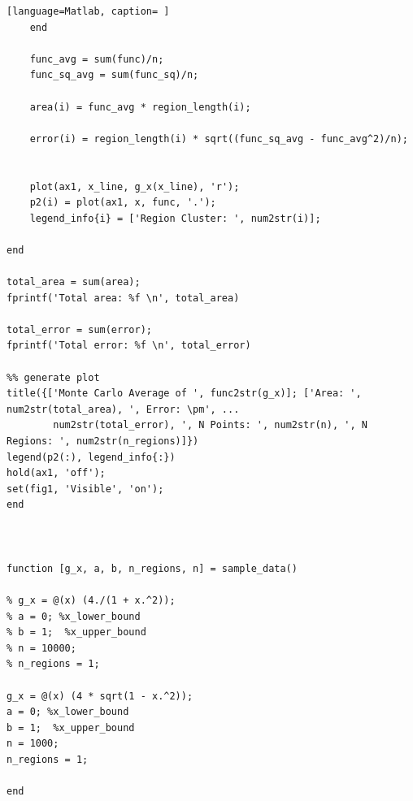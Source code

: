\documentclass[12pt]{article}
\begin{document}
\begin{lstlisting}[language=Matlab, caption= ]
    end
    
    func_avg = sum(func)/n;
    func_sq_avg = sum(func_sq)/n;
    
    area(i) = func_avg * region_length(i);
  
    error(i) = region_length(i) * sqrt((func_sq_avg - func_avg^2)/n);
    

    plot(ax1, x_line, g_x(x_line), 'r');
    p2(i) = plot(ax1, x, func, '.');
    legend_info{i} = ['Region Cluster: ', num2str(i)]; 
    
end

total_area = sum(area);
fprintf('Total area: %f \n', total_area)

total_error = sum(error);
fprintf('Total error: %f \n', total_error)

%% generate plot
title({['Monte Carlo Average of ', func2str(g_x)]; ['Area: ', num2str(total_area), ', Error: \pm', ...
        num2str(total_error), ', N Points: ', num2str(n), ', N Regions: ', num2str(n_regions)]})
legend(p2(:), legend_info{:})
hold(ax1, 'off');
set(fig1, 'Visible', 'on');
end



function [g_x, a, b, n_regions, n] = sample_data()

% g_x = @(x) (4./(1 + x.^2));
% a = 0; %x_lower_bound
% b = 1;  %x_upper_bound
% n = 10000;
% n_regions = 1;

g_x = @(x) (4 * sqrt(1 - x.^2));
a = 0; %x_lower_bound
b = 1;  %x_upper_bound
n = 1000;
n_regions = 1;

end
\end{lstlisting}
\end{document}
